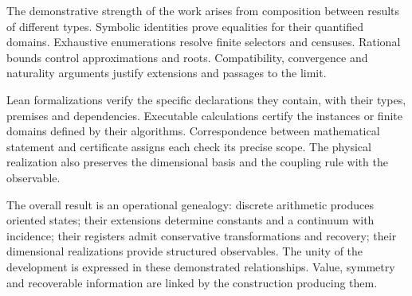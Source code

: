 The demonstrative strength of the work arises from composition between results of different types. Symbolic identities prove equalities for their quantified domains. Exhaustive enumerations resolve finite selectors and censuses. Rational bounds control approximations and roots. Compatibility, convergence and naturality arguments justify extensions and passages to the limit.

Lean formalizations verify the specific declarations they contain, with their types, premises and dependencies. Executable calculations certify the instances or finite domains defined by their algorithms. Correspondence between mathematical statement and certificate assigns each check its precise scope. The physical realization also preserves the dimensional basis and the coupling rule with the observable.

The overall result is an operational genealogy: discrete arithmetic produces oriented states; their extensions determine constants and a continuum with incidence; their registers admit conservative transformations and recovery; their dimensional realizations provide structured observables. The unity of the development is expressed in these demonstrated relationships. Value, symmetry and recoverable information are linked by the construction producing them.

